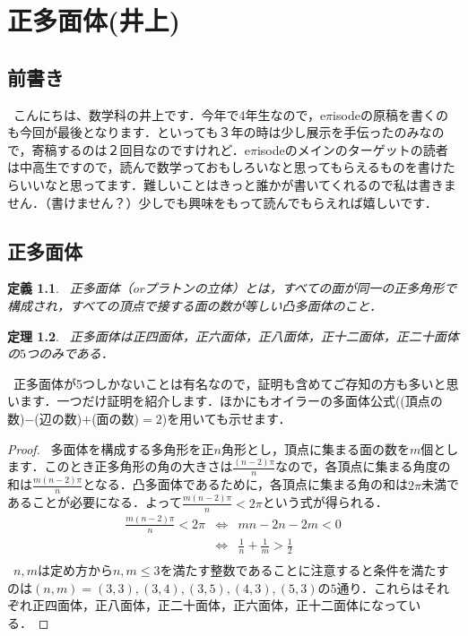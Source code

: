 \documentclass[./main]{subfiles}
\theoremstyle{idefinition}
\newtheorem{idefi}{定義}[section]
\newtheorem{ithm}[idefi]{定理}
\begin{document}
\chapter{正多面体(井上)}

\section{前書き}
\ こんにちは、数学科の井上です．今年で4年生なので，e$\pi$isodeの原稿を書くのも今回が最後となります．といっても３年の時は少し展示を手伝ったのみなので，寄稿するのは２回目なのですけれど．e$\pi$isodeのメインのターゲットの読者は中高生ですので，読んで数学っておもしろいなと思ってもらえるものを書けたらいいなと思ってます．難しいことはきっと誰かが書いてくれるので私は書きません．（書けません？）少しでも興味をもって読んでもらえれば嬉しいです．\\

\section{正多面体}
\begin{idefi}
\ 正多面体（orプラトンの立体）とは，すべての面が同一の正多角形で構成され，すべての頂点で接する面の数が等しい凸多面体のこと．
\end{idefi}

\begin{ithm}
\ 正多面体は正四面体，正六面体，正八面体，正十二面体，正二十面体の$5$つのみである．
\end{ithm}

\ 正多面体が5つしかないことは有名なので，証明も含めてご存知の方も多いと思います．一つだけ証明を紹介します．ほかにもオイラーの多面体公式((頂点の数)$-$(辺の数)$+$(面の数)$=2$)を用いても示せます．\\

\begin{proof}
\ 多面体を構成する多角形を正$n$角形とし，頂点に集まる面の数を$m$個とします．このとき正多角形の角の大きさは$\frac{(n-2)\pi}{n}$なので，各頂点に集まる角度の和は$\frac{m(n-2)\pi}{n}$となる．凸多面体であるために，各頂点に集まる角の和は$2\pi$未満であることが必要になる．よって$\frac{m(n-2)\pi}{n}<2\pi$という式が得られる．
\[
\begin{array}{ccc}
\frac{m(n-2)\pi}{n}<2\pi & \Longleftrightarrow & mn-2n-2m<0 \\
& \Longleftrightarrow & \frac{1}{n}+\frac{1}{m}>\frac{1}{2}\\
\end{array}
\]
\ $n,m$は定め方から$n,m\leq3$を満たす整数であることに注意すると条件を満たすのは$(n,m)=(3,3),(3,4),(3,5),(4,3),(5,3)$の$5$通り．これらはそれぞれ正四面体，正八面体，正二十面体，正六面体，正十二面体になっている．
\end{proof}
\end{document}

